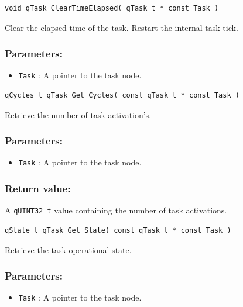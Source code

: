 \documentclass{article}
\begin{document}
\noindent\hrulefill


\begin{lstlisting}[style=CStyle]
void qTask_ClearTimeElapsed( qTask_t * const Task )
\end{lstlisting}

Clear the elapsed time of the task. Restart the internal task tick. 

\subsubsection*{Parameters:}
\begin{itemize}
    \item \lstinline{Task} : A pointer to the task node.
\end{itemize}

\noindent\hrulefill


\begin{lstlisting}[style=CStyle]
qCycles_t qTask_Get_Cycles( const qTask_t * const Task )
\end{lstlisting}

Retrieve the number of task activation's. 

\subsubsection*{Parameters:}
\begin{itemize}
    \item \lstinline{Task} : A pointer to the task node.
\end{itemize}


\subsubsection*{Return value:}
A \lstinline{qUINT32_t} value containing the number of task activations.

\noindent\hrulefill


\begin{lstlisting}[style=CStyle]
qState_t qTask_Get_State( const qTask_t * const Task )
\end{lstlisting}

Retrieve the task operational state. 

\subsubsection*{Parameters:}
\begin{itemize}
    \item \lstinline{Task} : A pointer to the task node.
\end{itemize}
\end{document}
